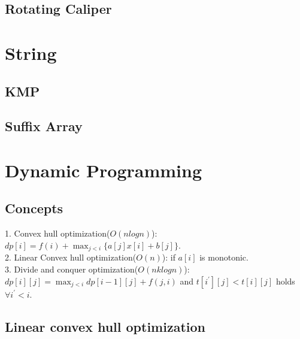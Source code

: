 \documentclass[a4paper,10pt,twocolumn,oneside]{article}
\begin{document}
\subsection{Rotating Caliper}

\section{String}
\subsection{KMP}

\subsection{Suffix Array}

\section{Dynamic Programming}
\subsection{Concepts}
1. Convex hull optimization($O(nlogn)$): $dp[i]=f(i)+\max_{j<i}\{a[j]x[i]+b[j]\}$. \\
2. Linear Convex hull optimization($O(n)$): if $a[i]$ is monotonic. \\
3. Divide and conquer optimization($O(nklogn)$): $dp[i][j]=\max_{j<i}{dp[i-1][j]+f(j,i)}$ and $t[i^\prime][j]<t[i][j]$ holds $\forall i^\prime<i$.
\subsection{Linear convex hull optimization}

\end{document}
